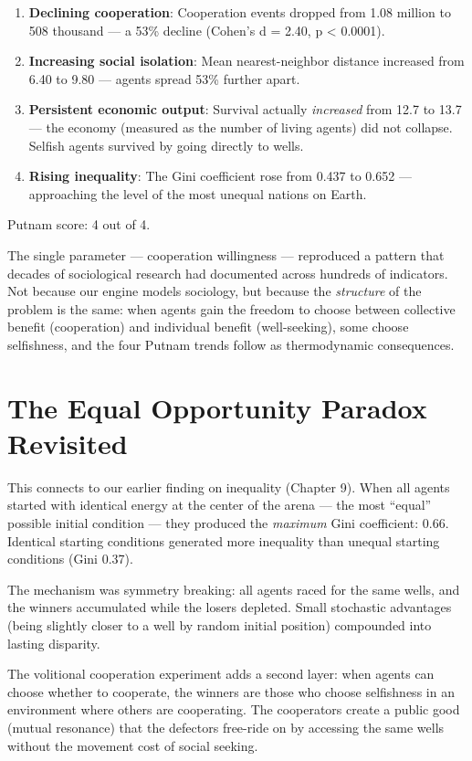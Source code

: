 \begin{enumerate}
\def\labelenumi{\arabic{enumi}.}
\item
  \textbf{Declining cooperation}: Cooperation events dropped from 1.08 million to 508 thousand --- a 53\% decline (Cohen's d = 2.40, p \textless{} 0.0001).
\item
  \textbf{Increasing social isolation}: Mean nearest-neighbor distance increased from 6.40 to 9.80 --- agents spread 53\% further apart.
\item
  \textbf{Persistent economic output}: Survival actually \emph{increased} from 12.7 to 13.7 --- the economy (measured as the number of living agents) did not collapse. Selfish agents survived by going directly to wells.
\item
  \textbf{Rising inequality}: The Gini coefficient rose from 0.437 to 0.652 --- approaching the level of the most unequal nations on Earth.
\end{enumerate}

Putnam score: 4 out of 4.

The single parameter --- cooperation willingness --- reproduced a pattern that decades of sociological research had documented across hundreds of indicators. Not because our engine models sociology, but because the \emph{structure} of the problem is the same: when agents gain the freedom to choose between collective benefit (cooperation) and individual benefit (well-seeking), some choose selfishness, and the four Putnam trends follow as thermodynamic consequences.

\section{The Equal Opportunity Paradox Revisited}\label{the-equal-opportunity-paradox-revisited}

This connects to our earlier finding on inequality (Chapter 9). When all agents started with identical energy at the center of the arena --- the most ``equal'' possible initial condition --- they produced the \emph{maximum} Gini coefficient: 0.66. Identical starting conditions generated more inequality than unequal starting conditions (Gini 0.37).

The mechanism was symmetry breaking: all agents raced for the same wells, and the winners accumulated while the losers depleted. Small stochastic advantages (being slightly closer to a well by random initial position) compounded into lasting disparity.

The volitional cooperation experiment adds a second layer: when agents can choose whether to cooperate, the winners are those who choose selfishness in an environment where others are cooperating. The cooperators create a public good (mutual resonance) that the defectors free-ride on by accessing the same wells without the movement cost of social seeking.

